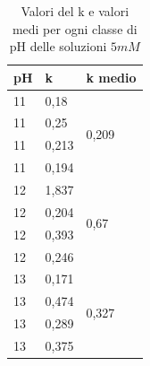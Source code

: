 \begin{table}
\caption{Valori del k e valori medi per ogni classe di pH delle soluzioni $5mM$}
\begin{center}
\begin{tabular}{lll}
\textbf{pH} & \textbf{k} & \textbf{k medio}       \\ \hline
11          & 0,18       & \multirow{4}{*}{0,209} \\
11          & 0,25       &                        \\
11          & 0,213      &                        \\
11          & 0,194      &                        \\ \hline
12          & 1,837      & \multirow{4}{*}{0,67}  \\
12          & 0,204      &                        \\
12          & 0,393      &                        \\
12          & 0,246      &                        \\ \hline
13          & 0,171      & \multirow{4}{*}{0,327} \\
13          & 0,474      &                        \\
13          & 0,289      &                        \\
13          & 0,375      &    
\end{tabular}
\end{center}
\end{table}
\pagebreak

